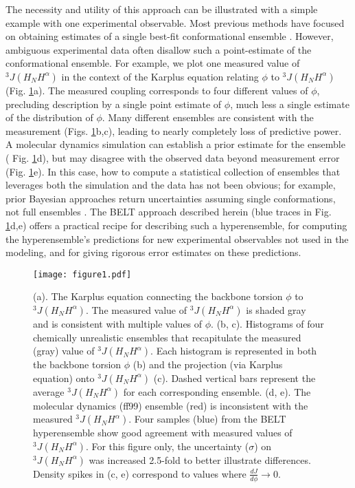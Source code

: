 \documentclass[12pt]{article}
\begin{document}
The necessity and utility of this approach can be illustrated with a simple example with one experimental observable. Most previous methods have focused on obtaining estimates of a single best-fit conformational ensemble  \cite{rozycki2011saxs,  Graf2007, chodera2012}.  However, ambiguous experimental data often disallow such a point-estimate of the conformational ensemble.  For example, we plot one measured  \cite{Graf2007} value of $^3J(H_NH^\alpha)$ in the context of the Karplus \cite{vogeli2007limits} equation relating $\phi$ to $^3J(H_NH^\alpha)$ (Fig. \ref{figure:Ambiguity}a).  The measured coupling corresponds to four different values of $\phi$, precluding description by a single point estimate of $\phi$, much less a single estimate of the distribution of $\phi$. Many different ensembles are consistent with the measurement (Figs. \ref{figure:Ambiguity}b,c), leading to nearly completely loss of predictive power. A molecular dynamics simulation can establish a prior estimate for the ensemble 
( Fig. \ref{figure:Ambiguity}d),  but may disagree with the observed data beyond measurement error (Fig. \ref{figure:Ambiguity}e). In this case, how to compute a statistical collection of ensembles that leverages both the simulation and the data has not been obvious; for example, prior Bayesian approaches return uncertainties assuming single conformations, not full ensembles \cite{rieping2005}.  The BELT approach described herein (blue traces in Fig. \ref{figure:Ambiguity}d,e) offers a practical recipe for describing such a hyperensemble, for computing the hyperensemble's predictions for new experimental observables not used in the modeling, and for giving rigorous error estimates on these predictions.

\begin{figure}

\texttt{[image: figure1.pdf]}

\caption{
(a).  The Karplus equation connecting the backbone torsion $\phi$ to $^3J(H_NH^\alpha)$.  The measured value of $^3J(H_NH^\alpha)$ is shaded gray and is consistent with multiple values of $\phi$.  (b, c).  Histograms of four chemically unrealistic ensembles that recapitulate the measured (gray) value of $^3J(H_NH^\alpha)$.  Each histogram is represented in both the backbone torsion $\phi$ (b) and the projection (via Karplus equation) onto $^3J(H_NH^\alpha)$ (c).  Dashed vertical bars represent the average $^3J(H_NH^\alpha)$ for each corresponding ensemble.  (d, e).  The molecular dynamics (ff99) ensemble (red) is inconsistent with the measured $^3J(H_NH^\alpha)$.  Four samples (blue) from the BELT hyperensemble show good agreement with measured values of $^3J(H_NH^\alpha)$.  For this figure only, the uncertainty ($\sigma$) on $^3J(H_NH^\alpha)$ was increased 2.5-fold to better illustrate differences.  Density spikes in (c, e) correspond to values where $\frac{dJ}{d\phi} \rightarrow 0$.  
}
\label{figure:Ambiguity}
\end{figure}
\end{document}
